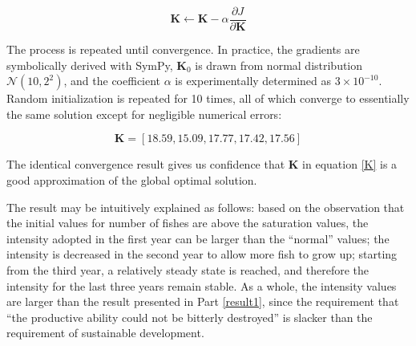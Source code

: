 \documentclass{IEEEtran}
\begin{document}
$$\boldsymbol{K}\leftarrow \boldsymbol{K} - \alpha \frac{\partial J}{\partial \boldsymbol{K}}$$

The process is repeated until convergence. In practice, the gradients are symbolically derived with SymPy, $\boldsymbol{K}_0$ is drawn from normal distribution $\mathcal{N}(10, 2^2)$, and the coefficient $\alpha$ is experimentally determined as $3\times 10^{-10}$. Random initialization is repeated for 10 times, all of which converge to essentially the same solution except for negligible numerical errors:

\begin{equation}\label{K}\boldsymbol{K} = [18.59, 15.09, 17.77, 17.42, 17.56]\end{equation}
    
The identical convergence result gives us confidence that $\boldsymbol{K}$ in equation \ref{K} is a good approximation of the global optimal solution.

The result may be intuitively explained as follows: based on the observation that the initial values for number of fishes are above the saturation values, the intensity adopted in the first year can be larger than the ``normal'' values; the intensity is decreased in the second year to allow more fish to grow up; starting from the third year, a relatively steady state is reached, and therefore the intensity for the last three years remain stable. As a whole, the intensity values are larger than the result presented in Part \ref{result1}, since the requirement that ``the productive ability could not be bitterly destroyed'' is slacker than the requirement of sustainable development.
\end{document}
